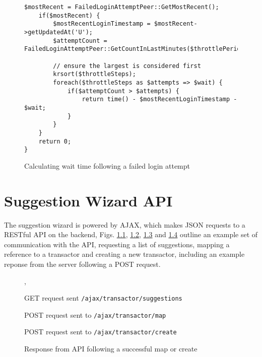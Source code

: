 \begin{appendices}
\begin{figure}
\begin{lstlisting}[style=phpcolor]
	$mostRecent = FailedLoginAttemptPeer::GetMostRecent();		
	if($mostRecent) {
		$mostRecentLoginTimestamp = $mostRecent->getUpdatedAt('U');
		$attemptCount = FailedLoginAttemptPeer::GetCountInLastMinutes($throttlePeriodMinutes);
		
		// ensure the largest is considered first
		krsort($throttleSteps);
		foreach($throttleSteps as $attempts => $wait) {
			if($attemptCount > $attempts) {
				return time() - $mostRecentLoginTimestamp - $wait;
			}
		}
	}
	return 0;
}
\end{lstlisting}
\caption{Calculating wait time following a failed login attempt}
\label{fig:getThrottlingWaitSeconds}
\end{figure}

\chapter{Suggestion Wizard API} \label{app:suggestionwizard-api}

The suggestion wizard is powered by AJAX, which makes JSON requests to a RESTful API on the backend, Figs. \ref{fig:json-post-example}, \ref{fig:json-map-example}, \ref{fig:json-create-example}  and \ref{fig:json-response-example} outline an example set of communication with the API, requesting a list of suggestions, mapping a reference to a transactor and creating a new transactor, including an example reponse from the server following a POST request.

\begin{figure}
    
    \caption{GET request sent \lstinline{/ajax/transactor/suggestions}}
    \label{fig:json-post-example},
\end{figure}

\begin{figure}
    
    \caption{POST request sent to \lstinline{/ajax/transactor/map}}
    \label{fig:json-map-example}
\end{figure}

\begin{figure}
    
    \caption{POST request sent to \lstinline{/ajax/transactor/create}}
    \label{fig:json-create-example}
\end{figure}

\begin{figure}
    
    \caption{Response from API following a successful map or create}
    \label{fig:json-response-example}
\end{figure}

\end{appendices}

